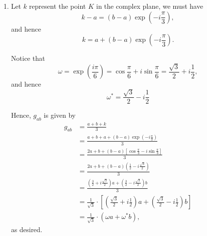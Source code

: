 \Question{\currfilebase}
\begin{enumerate}
    \item Let \(k\) represent the point \(K\) in the complex plane, we must have
          \[
              k - a = (b - a) \exp\left(- i\frac{\pi}{3}\right),
          \]
          and hence
          \[
              k = a + (b - a) \exp\left(- i\frac{\pi}{3}\right).
          \]

          Notice that
          \[
              \omega = \exp \left(\frac{i\pi}{6}\right) = \cos \frac{\pi}{6} + i \sin \frac{\pi}{6} = \frac{\sqrt{3}}{2} + i \frac{1}{2},
          \]
          and hence
          \[
              \omega^* = \frac{\sqrt{3}}{2} - i \frac{1}{2}
          \]

          Hence, \(g_{ab}\) is given by
          \begin{align*}
              g_{ab} & = \frac{a + b + k}{3}                                                                                                                         \\
                     & = \frac{a + b + a + (b - a) \exp\left(- i\frac{\pi}{3}\right)}{3}                                                                             \\
                     & = \frac{2a + b + (b - a) \left[\cos \frac{\pi}{3} - i \sin \frac{\pi}{3}\right]}{3}                                                           \\
                     & = \frac{2a + b + (b - a) \left(\frac{1}{2} - i \frac{\sqrt{3}}{2}\right)}{3}                                                                  \\
                     & = \frac{\left(\frac{3}{2} + i \frac{\sqrt{3}}{2}\right) a + \left(\frac{3}{2} - i \frac{\sqrt{3}}{2}\right) b}{3}                             \\
                     & = \frac{1}{\sqrt{3}} \cdot \left[\left(\frac{\sqrt{3}}{2} + i \frac{1}{2}\right) a + \left(\frac{\sqrt{3}}{2} - i \frac{1}{2}\right) b\right] \\
                     & = \frac{1}{\sqrt{3}} \cdot \left(\omega a + \omega^* b\right),
          \end{align*}
          as desired.


\end{enumerate}
